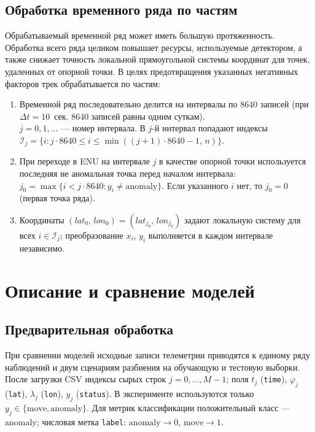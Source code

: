 \documentclass[a4paper,12pt]{report}
\begin{document}
	\subsection{Обработка временного ряда по частям}
	Обрабатываемый временной ряд может иметь большую протяженность. Обработка всего ряда целиком повышает ресурсы, используемые детектором, а также снижает точность локальной прямоугольной системы координат для точек, удаленных от опорной точки. В целях предотвращения указанных негативных факторов трек обрабатывается по частям:
	\begin{enumerate}
		\item Временной ряд последовательно делится на интервалы по $8640$ записей (при $\Delta t = 10$~сек. $8640$ записей равны одним суткам). \\
		$j = 0, 1, \ldots$ --- номер интервала. В $j$-й интервал попадают индексы \\
		$\mathcal{I}_j = \{i : j \cdot 8640 \leq i \leq \min((j+1)\cdot 8640 - 1,\, n)\}$.
		\item При переходе в ENU на интервале $j$ в качестве опорной точки используется последняя не аномальная точка перед началом интервала: $j_0 = \max\{i < j \cdot 8640 : y_i \neq \mathrm{anomaly}\}$. Если указанного $i$ нет, то $j_0 = 0$ (первая точка ряда).
		\item Координаты $(\mathit{lat}_0,\, \mathit{lon}_0) = (\mathit{lat}_{j_0},\, \mathit{lon}_{j_0})$ задают локальную систему для всех $i \in \mathcal{I}_j$; преобразование $x_i$, $y_i$ выполняется в каждом интервале независимо.
	\end{enumerate}

	\section{Описание и сравнение моделей}
	\subsection{Предварительная обработка}
	При сравнении моделей исходные записи телеметрии приводятся к единому ряду наблюдений и двум сценариям разбиения на обучающую и тестовую выборки. После загрузки CSV индексы сырых строк $j=0,\ldots,M-1$; поля $t_j$ (\texttt{time}), $\varphi_j$ (\texttt{lat}), $\lambda_j$ (\texttt{lon}), $y_j$ (\texttt{status}). В эксперименте используются только $y_j\in\{\mathrm{move},\mathrm{anomaly}\}$. Для метрик классификации положительный класс --- $\mathrm{anomaly}$; числовая метка \texttt{label}: $\mathrm{anomaly}\rightarrow 0$, $\mathrm{move}\rightarrow 1$.
\end{document}
